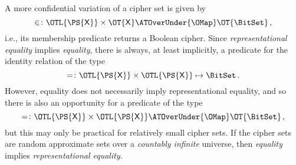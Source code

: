 \documentclass[ ../main.tex]{subfiles}
\begin{document}
A more confidential variation of a cipher set is given by
\begin{equation}
	\SetContains \colon \OTL{\PS{\Set{X}}} \times \OT{\Set{X}} \ATOverUnder{\OMap} \OT{\BitSet}\,,
\end{equation}
i.e., its membership predicate returns a Boolean cipher.
Since \emph{representational equality} implies \emph{equality}, there is always, at least implicitly, a predicate for the identity relation of the type
\begin{equation}
	= \colon \OTL{\PS{\Set{X}}} \times \OTL{\PS{\Set{X}}} \mapsto \BitSet\,.
\end{equation}
However, equality does not necessarily imply representational equality, and so there is also an opportunity for a predicate of the type
\begin{equation}
	= \colon \OTL{\PS{\Set{X}}} \times \OTL{\PS{\Set{X}}} \ATOverUnder{\OMap} \OT{\BitSet}\,,
\end{equation}
but this may only be practical for relatively small cipher sets.
If the cipher sets are random approximate sets over a \emph{countably infinite} universe, then \emph{equality} implies \emph{representational equality}.
\end{document}
